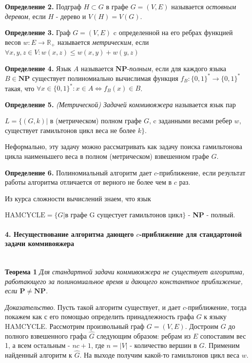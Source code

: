 \documentclass[14pt]{article}
\begin{document}
    \textbf{Определение 2.}  Подграф  $H \subset G$ в графе $G = (V,E)$ называется \textit{остовным деревом}, если $H$ - дерево и $V(H) = V(G)$.

    \textbf{Определение 3.} Граф $G = (V,E)$ c определенной на его ребрах функцией весов  $w: E \to \mathbb{R}_{+}$ называется \textit{метрическим}, если $\forall x,y,z \in V: w(x,z) \leq w(x,y) + w(y,z)$

    \textbf{Определение 4.} Язык $A$ называется $\mathbf{NP}$-\textit{полным}, если для каждого языка $B \in \mathbf{NP}$   существует полиномиально вычислимая функция $f_B:\{0,1\}^* \to \{0,1\}^*$ такая, что $\forall x \in \{0,1\}^*: x \in A \iff f_B(x) \in B$.

    \textbf{Определение 5.} \textit{(Метрической) Задачей коммивояжера} называется язык пар 

     $L = \{(G,k)|$ в (метрическом) полном графе $G$, c заданными весами ребер $w$, существует гамильтонов цикл веса не более  $k\}$.

    Неформально, эту задачу можно рассматривать как задачу поиска гамильтонова цикла наименьшего веса в полном (метрическом) взвешенном графе $G$.

    \textbf{Определение 6.} Полиномиальный алгоритм дает $c$-приближение, если результат работы алгоритма отличается от верного не более чем в $c$ раз.

    Из курса сложности вычислений знаем, что язык 

    $\text{HAMCYCLE}=\{G| \text{в графе G сущестует гамильтонов цикл}\}$ - \textbf{NP} - полный.
    \newpage

    \paragraph{\large{4. Несуществование алгоритма дающего $c$-приближение для стандартоной задачи коммивояжера}}\mbox{}\\

    \textbf{Теорема 1} \textit{Для стандартной задачи коммивояжера не существует алгоритма, работающего за полиномиальное время и дающего константное приближение, если $\mathbf{P} \neq \mathbf{NP}$.}

    \textit{Доказательство}. Пусть такой алгоритм существует, и дает $c$-приближение, тогда покажем как с его помощью определить принадлежность графа $G$ к языку HAMCYCLE. Рассмотрим произвольный граф $G = (V,E)$. Достроим $G$ до полного взвешенного графа $\hat{G}$ следующим образом: ребрам из $E$ сопоставим вес 1, а всем остальным - $nc + 1$, где $n = |V|$ - количество вершин в $G$. Применим найденный алгоритм к $\hat{G}$. На выходе получим какой-то гамильтонов цикл веса $w$.
\end{document}
